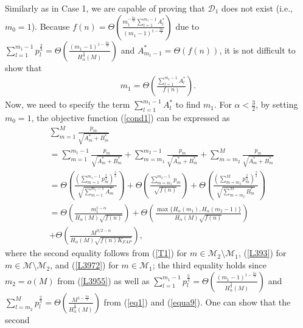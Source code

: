 \documentclass[10pt,journal,compsoc,onecolumn]{IEEEtran}
\begin{document}
Similarly as in Case 1, we are capable of proving that
$\mathcal{D}_1$ does not exist (i.e., $m_0=1$). Because
$f(n)=\Theta\left(\frac{m_1^{-\frac{2\alpha}{3}}\sum_{l=1}^{m_1-1}A_l^*}{(m_1-1)^{1-\frac{2\alpha}{3}}}\right)$
due to $\sum_{l=1}^{m_1-1}
p^{\frac{2}{3}}_l=\Theta\left(\frac{(m_1-1)^{1-\frac{2\alpha}{3}}}{H^{\frac{2}{3}}_{\alpha}(M)}\right)$
and $A_{m_1-1}^*=\Theta\left(f(n)\right)$, it is not difficult to
show that
\begin{align}
\label{L39551}
m_1=\Theta\left(\frac{\sum_{l=1}^{m_1-1}A_l^*}{f(n)}\right).
\end{align}
Now, we need to specify the term $\sum_{l=1}^{m_1-1}A_l^*$ to find
$m_1$. For $\alpha<\frac{3}{2}$, by setting $m_0=1$, the objective
function (\ref{cond1}) can be expressed as
\begin{align}
\label{equa345}& \sum_{m\!=\!1}^{M}\!
\frac{p_m}{\sqrt{A_m^*\!+\!B_m^*}}\nonumber\\&=\sum_{m=1}^{m_1\!-\!1}\!
\frac{p_m}{\sqrt{A_m^*\!+\!B_m^*}}+\sum_{m\!=\!m_1}^{m_2\!-\!1}
\!\frac{p_m}{\sqrt{A_m^*\!+\!B_m^*}}+\sum_{m\!=\!m_2}^{M}\!
\frac{p_m}{\sqrt{A_m^*\!+\!B_m^*}} \nonumber \\&=
\Theta\!\!\left(\!\!\frac{\left(\!\sum_{m=1}^{m_1\!-\!1}
\!p_{m}^{\frac{2}{3}}\!\!\right)^{\!\frac{3}{2}}}{\sqrt{\sum_{m=1}^{m_1\!-\!1}
\!A_m^*}}\!\right)\!+\!\Theta\!\!\left(\!\!\frac{\sum_{m=m_1}^{m_2\!-\!1}
\!p_{m}}{\sqrt{f(n)}}\!\!\right)\!+\!\Theta\!\!\left(\!\!\frac{\!\left(\!\sum_{m=m_2}^{M}\!
p_{m}^{\frac{2}{3}}\!\right)^{\!\frac{3}{2}}}{\sqrt{\sum_{m=m_2}^{M}
B_m^*}}\!\!\right)\nonumber \\&=
\!\Theta\!\left(\!\frac{m_1^{1-\alpha}}{H_{\alpha}\!(\!M\!)\sqrt{
f(n)}}\!\right)\!+\!\Theta\!\left(\!\frac{\max \lbrace
H_{\alpha}\!(\!m_1\!),H_{\alpha}\!(\!m_2-1\!)\rbrace}{H_{\alpha}(M)\sqrt{f(n)}}\!\right)\!\nonumber\\&+\!\Theta\!\left(\!\frac{M^{3/2-\alpha}}{H_{\alpha}(M)\!\sqrt{\!f(n)\!K_{FAP}}}\!\right)\!,
\end{align}
where the second equality follows from (\ref{T1}) for $m \in
\mathcal{M}_2\setminus\mathcal{M}_1$, (\ref{L393}) for $m \in
\mathcal{M}\setminus\mathcal{M}_2$, and (\ref{L3972}) for $m \in
\mathcal{M}_1$; the third equality holds since $m_2=o(M)$ from
(\ref{L3955}) as well as $\sum_{l=1}^{m_1-1}
p^{\frac{2}{3}}_l=\Theta\left(\frac{(m_1-1)^{1-\frac{2\alpha}{3}}}{H^{\frac{2}{3}}_{\alpha}(M)}\right)$
and $\sum_{l=m_2}^{M}
p^{\frac{2}{3}}_l=\Theta\left(\frac{M^{1-\frac{2\alpha}{3}}}{H^{\frac{2}{3}}_{\alpha}(M)}\right)$
from (\ref{eq1}) and (\ref{equa9}). One can show that the second
\end{document}
